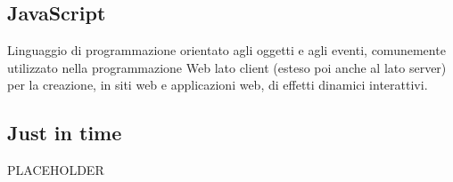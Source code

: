 \documentclass[../glossario.tex]{subfiles}
\begin{document}
\subsection*{JavaScript}
Linguaggio di programmazione orientato agli oggetti e agli eventi, comunemente utilizzato nella programmazione Web lato client (esteso poi anche al lato server) per la creazione, in siti web e applicazioni web, di effetti dinamici interattivi.

\subsection*{Just in time}
PLACEHOLDER
    
\end{document}
